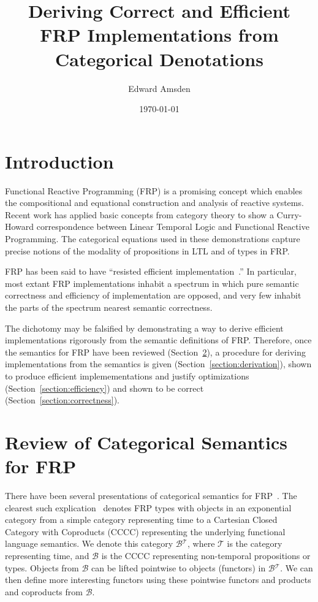 \documentclass{article}
\title{Deriving Correct and Efficient FRP Implementations from Categorical Denotations}
\author{Edward Amsden}
\date{\today}
\newcommand{\lambdacat}[0]{\mathcal{B}}
\newcommand{\timecat}[0]{\mathcal{T}}
\newcommand{\fancat}[0]{\lambdacat{}^\timecat{}}
\begin{document}
\maketitle

\section{Introduction}
\label{section:introduction}

Functional Reactive Programming (FRP) is a promising concept which enables the compositional and equational construction and analysis of reactive systems. Recent work has applied basic concepts from category theory to show a Curry-Howard correspondence between Linear Temporal Logic and Functional Reactive Programming. The categorical equations used in these demonstrations capture precise notions of the modality of propositions in LTL and of types in FRP.

FRP has been said to have ``resisted efficient implementation~\cite{Elliott}.'' In particular, most extant FRP implementations inhabit a spectrum in which pure semantic correctness and efficiency of implementation are opposed, and very few inhabit the parts of the spectrum nearest semantic correctness.

The dichotomy may be falsified by demonstrating a way to derive efficient implementations rigorously from the semantic definitions of FRP. Therefore, once the semantics for FRP have been reviewed (Section~\ref{section:semantics}), a procedure for deriving implementations from the semantics is given (Section~\ref{section:derivation}), shown to produce efficient implemementations and justify optimizations (Section~\ref{section:efficiency}) and shown to be correct (Section~\ref{section:correctness}).

\section{Review of Categorical Semantics for FRP}
\label{section:semantics}
There have been several presentations of categorical semantics for FRP~\cite{Jeffrey,Krishnaswami}. The clearest such explication~\cite{Jeltsch} denotes FRP types with objects in an exponential category from a simple category representing time to a Cartesian Closed Category with Coproducts (CCCC) representing the underlying functional language semantics. We denote this category $\fancat{}$, where $\timecat{}$ is the category representing time, and $\lambdacat{}$ is the CCCC representing non-temporal propositions or types. Objects from $\lambdacat{}$ can be lifted pointwise to objects (functors) in $\fancat{}$. We can then define more interesting functors using these pointwise functors and products and coproducts from $\lambdacat{}$. 
\end{document}
